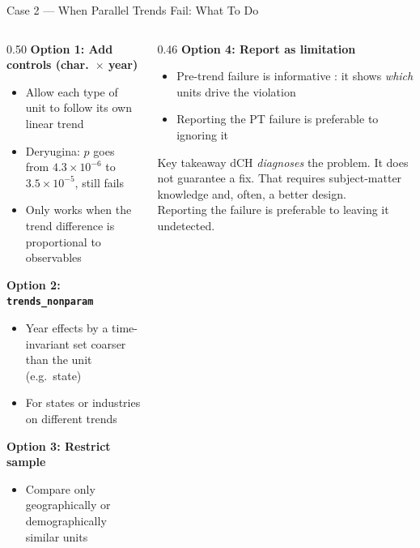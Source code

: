 \documentclass[main.tex]{subfiles}
\begin{document}
\begin{frame}{Case 2 --- When Parallel Trends Fail: What To Do}

  \begin{columns}[T]
    \begin{column}{0.50\textwidth}
      \textbf{Option 1: Add controls (char.\ $\times$ year)}
      \begin{itemize}\small
        \item Allow each type of unit to follow
          its own linear trend
        \item Deryugina: $p$ goes from $4.3\!\times\!10^{-6}$
          to $3.5\!\times\!10^{-5}$, still fails
        \item Only works when the trend difference
          is proportional to observables
      \end{itemize}

      \medskip
      \textbf{Option 2: \texttt{trends\_nonparam}}
      \begin{itemize}\small
        \item Year effects by a time-invariant set
          coarser than the unit (e.g.\ state)
        \item For states or industries on different trends
      \end{itemize}

      \medskip
      \textbf{Option 3: Restrict sample}
      \begin{itemize}\small
        \item Compare only geographically or
          demographically similar units
      \end{itemize}
    \end{column}
    \begin{column}{0.46\textwidth}
      \textbf{Option 4: Report as limitation}
      \begin{itemize}\small
        \item Pre-trend failure is informative
          : it shows \emph{which} units drive
          the violation
        \item Reporting the PT failure is
          preferable to ignoring it
      \end{itemize}

      \medskip
      \begin{alertblock}{\footnotesize Key takeaway}
        \footnotesize dCH \emph{diagnoses} the
        problem. It does not guarantee
        a fix. That requires subject-matter
        knowledge and, often, a better design.\\[4pt]
        Reporting the failure is preferable to
        leaving it undetected.
      \end{alertblock}
    \end{column}
  \end{columns}

\end{frame}
\end{document}
